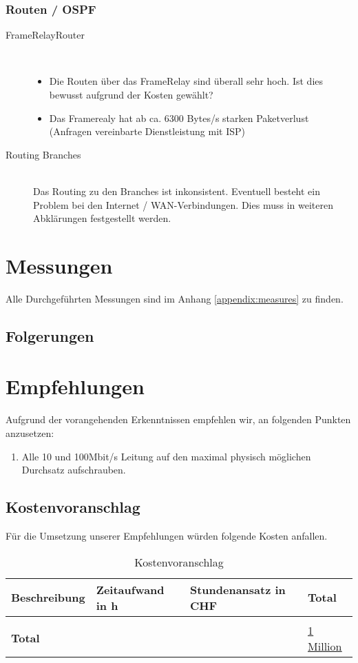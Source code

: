 \subsubsection{Routen / OSPF}

\begin{description}
	\item[FrameRelayRouter] \hfill \\
		\begin{itemize}
			\item Die Routen über das FrameRelay sind überall sehr hoch. Ist dies bewusst aufgrund der Kosten gewählt?
			\item Das Framerealy hat ab ca. 6300 Bytes/s starken Paketverlust (Anfragen vereinbarte Dienstleistung mit ISP)
		\end{itemize}
	\item[Routing Branches] \hfill \\
		Das Routing zu den Branches ist inkonsistent. Eventuell besteht ein Problem bei den Internet / WAN-Verbindungen. Dies muss in weiteren Abklärungen festgestellt werden.
\end{description}

\section{Messungen}
Alle Durchgeführten Messungen sind im Anhang \ref{appendix:measures} zu finden.

\subsection{Folgerungen}




\section{Empfehlungen}
Aufgrund der vorangehenden Erkenntnissen empfehlen wir, an folgenden Punkten anzusetzen:
\begin{enumerate}
	\item Alle 10 und 100Mbit/s Leitung auf den maximal physisch möglichen Durchsatz aufschrauben.
\end{enumerate}

\subsection{Kostenvoranschlag}
Für die Umsetzung unserer Empfehlungen würden folgende Kosten anfallen.
\begin{table}[h]
	\centering
	\begin{tabu} to \linewidth {l l l l}
		\toprule 
		Beschreibung & Zeitaufwand in h  & Stundenansatz in CHF & Total \\
		\midrule
		&&& \\
		\textbf{Total} & & & \underline{\underline{1 Million}} \\
		\bottomrule 
	\end{tabu} 
	\caption{Kostenvoranschlag}
\end{table}



